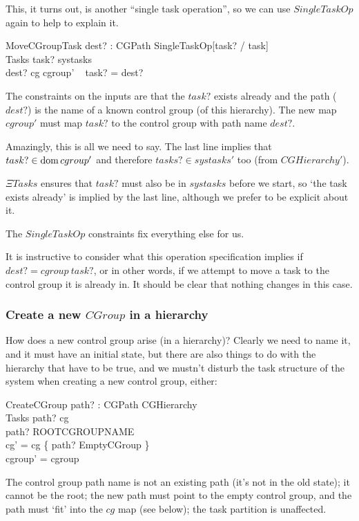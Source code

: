 \documentclass[a4paper,twoside,12pt]{article}
\begin{document}
This, it turns out, is another ``single task operation'', so we can use $SingleTaskOp$ again to help to explain it.

\begin{schema}{MoveCGroupTask}
dest? : CGPath
\also
SingleTaskOp[task? / task] \\
\Xi Tasks
\where
task? \in systasks \\
dest? \in \dom cg
\also
cgroup' ~ task?  = dest?
\end{schema}
The constraints on the inputs are that the $task?$ exists already and
the path ($dest?$) is the name of a known control group (of this hierarchy).
The new map $cgroup'$ must map $task?$ to the control group with path name $dest?$.

Amazingly, this is all we need to say. The last line implies that $task? \in \mathop{\mathrm{dom}} cgroup'$ and therefore
$tasks? \in systasks'$ too (from $CGHierarchy'$).

$\Xi Tasks$ ensures that $task?$ must also be in $systasks$ before we start, so `the task exists already' is implied by the last line, although we prefer to be explicit about it.

The $SingleTaskOp$ constraints fix everything else for us.

It is instructive to consider what this operation specification implies if $dest? = cgroup ~ task?$, or in other words, if we
attempt to move a task to the control group it is already in. It should be clear that nothing changes in this case.

\subsubsection{Create a new $CGroup$ in a hierarchy}

How does a new control group arise (in a hierarchy)?
Clearly we need to name it, and it must have an initial state, but there are also things to do with the
hierarchy that have to be true, and we mustn't disturb the task structure of the system when
creating a new control group, either:

\begin{schema}{CreateCGroup}
path? : CGPath
\also
\Delta CGHierarchy \\
\Xi Tasks
\where
path? \notin \dom cg \\
path? \neq ROOTCGROUPNAME \\
cg' = cg \cup \{ path? \mapsto EmptyCGroup \} \\
cgroup' = cgroup
\end{schema}
The control group path name is not an existing path (it's not in the old state); it cannot be the root; the new path must point to the empty control group, and the path must `fit' into the $cg$ map (see below); the task partition is unaffected.
\end{document}
